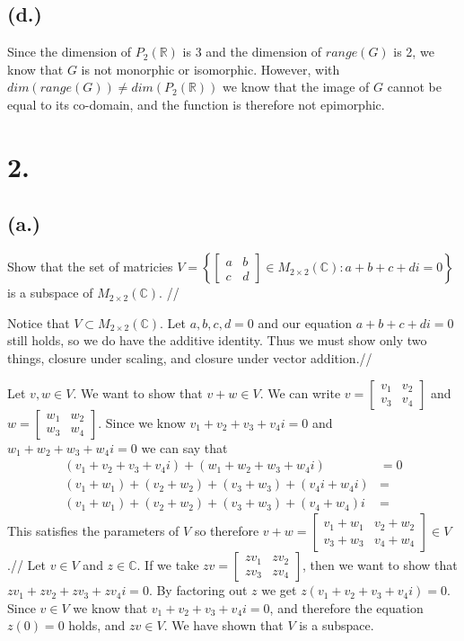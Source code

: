 \documentclass{article}
\begin{document}
	\subsection*{(d.)}
		Since the dimension of $P_2(\mathbb{R})$ is 3 and the dimension of $range(G)$ is 2, we know that $G$ is not monorphic or isomorphic.
		However, with $dim(range(G)) \neq dim(P_2(\mathbb{R}))$ we know that the image of $G$ cannot be equal to its co-domain, and the function is therefore not epimorphic.
\section*{2.}
	\subsection*{(a.)}
		Show that the set of matricies $V = \left \{ \begin{bmatrix} a & b\\c&d\end{bmatrix} \in M_{2\times2}(\mathbb{C}):a+b+c+di=0\right\}$ is a subspace of $M_{2\times2}(\mathbb{C})$. //

			Notice that $V\subset M_{2\times2}(\mathbb{C})$. Let $a,b,c,d = 0$ and our equation $a+b+c+di=0$ still holds, so we do have the additive identity. Thus we must show only two things, closure under scaling, and closure under vector addition.//
		
			Let $v, w \in V$. We want to show that $v+w \in V$.
			We can write $v = \begin{bmatrix} v_1 & v_2\\v_3&v_4\end{bmatrix}$ and $w = \begin{bmatrix} w_1 & w_2\\w_3&w_4\end{bmatrix}$.
			Since we know $v_1 + v_2 + v_3 + v_4i = 0$ and $w_1 + w_2 + w_3 + w_4i = 0$ we can say that 
			\begin{align*}
				(v_1 + v_2 + v_3 + v_4i) + (w_1 + w_2 + w_3 + w_4i) & = 0 \\
				(v_1 + w_1) + (v_2 + w_2) + (v_3 + w_3) + (v_4i + w_4i) & = \\
				(v_1 + w_1) + (v_2 + w_2) + (v_3 + w_3) + (v_4 + w_4)i & =
			\end{align*}
			This satisfies the parameters of $V$ so therefore $v + w =  \begin{bmatrix} v_1+w_1 & v_2+w_2\\v_3+w_3&v_4+w_4\end{bmatrix} \in V$.//
			Let $v \in V$ and $z \in \mathbb{C}$. If we take $zv =\begin{bmatrix} zv_1 & zv_2\\zv_3&zv_4\end{bmatrix}$, then we want to show that $zv_1 + zv_2 + zv_3 + zv_4i = 0$.
			By factoring out $z$ we get $z(v_1 + v_2 + v_3 + v_4i) = 0$.
			Since $v \in V$ we know that $v_1 + v_2 + v_3 + v_4i = 0$, and therefore the equation $z(0) = 0$ holds, and $zv \in V$.
			We have shown that $V$ is a subspace.
\end{document}
